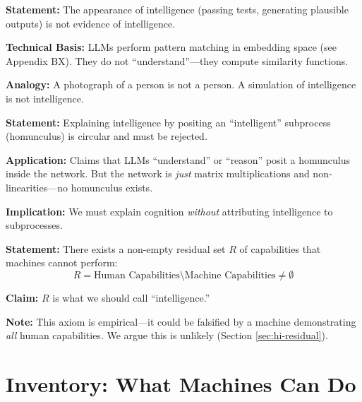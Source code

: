 \begin{tcolorbox}[colback=gray!5!white, colframe=gray!75!black,
    title=Axiom HI-3: Appearance Is Not Reality]
\textbf{Statement:} The appearance of intelligence (passing tests, generating plausible outputs) is not evidence of intelligence.

\textbf{Technical Basis:} LLMs perform pattern matching in embedding space (see Appendix BX). They do not ``understand''---they compute similarity functions.

\textbf{Analogy:} A photograph of a person is not a person. A simulation of intelligence is not intelligence.
\end{tcolorbox}

\begin{tcolorbox}[colback=gray!5!white, colframe=gray!75!black,
    title=Axiom HI-4: The Homunculus Trap]
\textbf{Statement:} Explaining intelligence by positing an ``intelligent'' subprocess (homunculus) is circular and must be rejected.

\textbf{Application:} Claims that LLMs ``understand'' or ``reason'' posit a homunculus inside the network. But the network is \textit{just} matrix multiplications and non-linearities---no homunculus exists.

\textbf{Implication:} We must explain cognition \textit{without} attributing intelligence to subprocesses.
\end{tcolorbox}

\begin{tcolorbox}[colback=gray!5!white, colframe=gray!75!black,
    title=Axiom HI-5: The Residual Exists]
\textbf{Statement:} There exists a non-empty residual set $R$ of capabilities that machines cannot perform:
\begin{equation}
R = \text{Human Capabilities} \setminus \text{Machine Capabilities} \neq \emptyset
\end{equation}

\textbf{Claim:} $R$ is what we should call ``intelligence.''

\textbf{Note:} This axiom is empirical---it could be falsified by a machine demonstrating \textit{all} human capabilities. We argue this is unlikely (Section \ref{sec:hi-residual}).
\end{tcolorbox}


\section{Inventory: What Machines Can Do}
\label{sec:hi-inventory}

